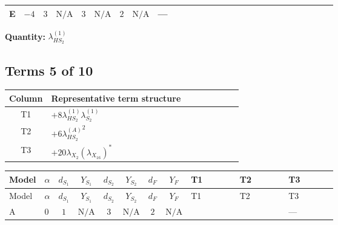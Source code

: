 \documentclass[8pt]{article}
\begin{document}
\begin{landscape}
\begin{longtable}{@{}llcccccc >{\raggedright\arraybackslash}p{0.21\linewidth} >{\raggedright\arraybackslash}p{0.21\linewidth} >{\raggedright\arraybackslash}p{0.21\linewidth}@{}}
\midrule
E & $-4$ & $3$ & $\text{N/A}$ & $3$ & $\text{N/A}$ & $2$ & $\text{N/A}$ & --- & \scriptsize\adjustbox{max width=\linewidth}{$\begin{gathered} +6 {\lambda_1} {\lambda_{HS_2}^{(1)}}\end{gathered}$} & \scriptsize\adjustbox{max width=\linewidth}{$\begin{gathered} +4 {\lambda_{HS_2}^{(1)}}^2\end{gathered}$} \\
\midrule
\bottomrule
\end{longtable}
\clearpage
\noindent\textbf{Quantity: }$\lambda_{HS_2}^{(1)}$\par\smallskip
\subsection*{Terms 5 of 10}
\begin{center}
\begin{tabular}{@{}c >{\raggedright\arraybackslash}p{0.82\linewidth}@{}}
\toprule
Column & Representative term structure \\
\midrule
T1 & \(\displaystyle +8 {\lambda_{HS_2}^{(1)}} {\lambda_{S_2}^{(1)}}\) \\
\midrule
T2 & \(\displaystyle +6 {\lambda_{HS_2}^{(A)}}^2\) \\
\midrule
T3 & \(\displaystyle +20 {\lambda_{X_{2}}} \left({\lambda_{X_{16}}}\right)^{*}\) \\
\midrule
\bottomrule
\end{tabular}
\end{center}
\smallskip
\tiny
\begin{longtable}{@{}llcccccc >{\raggedright\arraybackslash}p{0.21\linewidth} >{\raggedright\arraybackslash}p{0.21\linewidth} >{\raggedright\arraybackslash}p{0.21\linewidth}@{}}
\toprule
Model & $\alpha$ & $d_{S_1}$ & $Y_{S_1}$ & $d_{S_2}$ & $Y_{S_2}$ & $d_F$ & $Y_F$ & T1 & T2 & T3 \\
\midrule
\endfirsthead
\toprule
Model & $\alpha$ & $d_{S_1}$ & $Y_{S_1}$ & $d_{S_2}$ & $Y_{S_2}$ & $d_F$ & $Y_F$ & T1 & T2 & T3 \\
\midrule
\endhead
A & $0$ & $1$ & $\text{N/A}$ & $3$ & $\text{N/A}$ & $2$ & $\text{N/A}$ & \scriptsize\adjustbox{max width=\linewidth}{$\begin{gathered} +8 {\lambda_{HS_2}^{(1)}} {\lambda_{S_2}^{(1)}}\end{gathered}$} & \scriptsize\adjustbox{max width=\linewidth}{$\begin{gathered} +6 {\lambda_{HS_2}^{(A)}}^2\end{gathered}$} & --- \\

\end{longtable}
\end{landscape}
\end{document}
